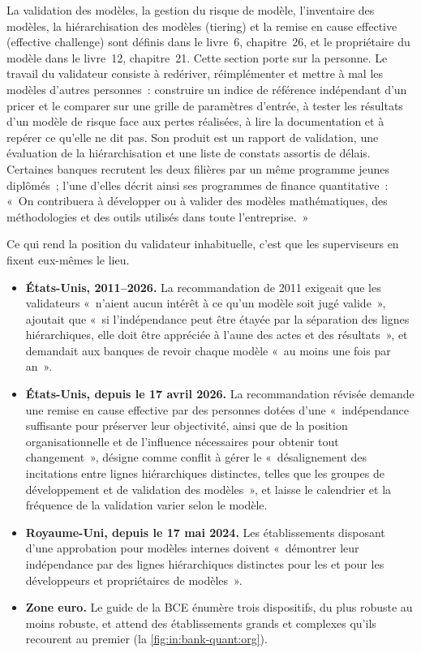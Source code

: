 La validation des modèles, la gestion du risque de modèle, l'inventaire des modèles, la hiérarchisation des modèles (tiering) et la remise en cause effective (effective challenge) sont définis dans
le livre~6, chapitre~26, et le propriétaire du modèle dans le livre~12, chapitre~21. Cette section porte sur la personne. Le travail du validateur
consiste à redériver, réimplémenter et mettre à mal les modèles d'autres personnes~: construire un indice de référence indépendant d'un pricer et le comparer
sur une grille de paramètres d'entrée, à tester les résultats d'un modèle de risque face aux pertes réalisées, à lire la documentation et à repérer ce
qu'elle ne dit pas. Son produit est un rapport de validation, une évaluation de la hiérarchisation et une liste de constats assortis de délais. Certaines banques
recrutent les deux filières par un même programme jeunes diplômés~; l'une d'elles décrit ainsi ses programmes de finance quantitative~: «~On
contribuera à développer ou à valider des modèles mathématiques, des méthodologies et des outils utilisés dans toute l'entreprise.~»

Ce qui rend la position du validateur inhabituelle, c'est que les superviseurs en fixent eux-mêmes le lieu.
\begin{itemize}
\item \textbf{États-Unis, 2011--2026.} La recommandation de 2011 exigeait que les validateurs «~n'aient aucun intérêt à ce qu'un modèle soit
jugé valide~», ajoutait que «~si l'indépendance peut être étayée par la séparation des lignes hiérarchiques, elle doit être
appréciée à l'aune des actes et des résultats~», et demandait aux banques de revoir chaque modèle «~au moins une fois par an~».
\item \textbf{États-Unis, depuis le 17 avril 2026.} La recommandation révisée demande une remise en cause effective par des personnes
dotées d'une «~indépendance suffisante pour préserver leur objectivité, ainsi que de la position organisationnelle et de l'influence
nécessaires pour obtenir tout changement~», désigne comme conflit à gérer le «~désalignement des incitations entre lignes hiérarchiques
distinctes, telles que les groupes de développement et de validation des modèles~», et laisse le calendrier et la fréquence de la validation varier selon le modèle.
\item \textbf{Royaume-Uni, depuis le 17 mai 2024.} Les établissements disposant d'une approbation pour modèles internes doivent
«~démontrer leur indépendance par des lignes hiérarchiques distinctes pour les  et pour les développeurs et propriétaires de modèles~».
\item \textbf{Zone euro.} Le guide de la BCE énumère trois dispositifs, du plus robuste au moins robuste, et attend des établissements
grands et complexes qu'ils recourent au premier (la \cref{fig:in:bank-quant:org}).
\end{itemize}

